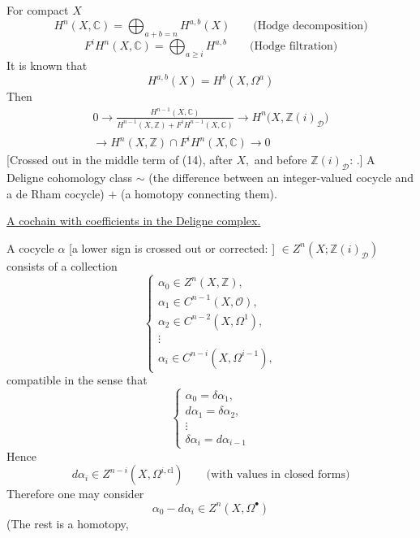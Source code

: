 For compact $X$
\begin{equation*}
H^n(X,\mathbb{C})=\bigoplus_{a+b=n}H^{a,b}(X)
\qquad\text{(Hodge decomposition)}\tag{11}
\end{equation*}
\begin{equation*}
F^iH^n(X,\mathbb{C})=\bigoplus_{a\ge i}H^{a,b}
\qquad\text{(Hodge filtration)}\tag{12}
\end{equation*}
It is known that
\begin{equation*}
H^{a,b}(X)=H^b(X,\Omega^a)\tag{13}
\end{equation*}
Then
\begin{equation*}
\begin{gathered}
0\longrightarrow
\frac{H^{n-1}(X,\mathbb{C})}
{H^{n-1}(X,\mathbb{Z})+F^iH^{n-1}(X,\mathbb{C})}
\longrightarrow H^n\bigl(X,\mathbb{Z}(i)_{\mathcal D}\bigr)\\
\longrightarrow H^n(X,\mathbb{Z})\cap F^iH^n(X,\mathbb{C})\longrightarrow0
\end{gathered}\tag{14}
\end{equation*}
[Crossed out in the middle term of (14), after $X,$ and before $\mathbb Z(i)_{\mathcal D}$:
.]
A Deligne cohomology class $\sim$ (the difference between an integer-valued cocycle and a de Rham cocycle) $+$ (a homotopy connecting them).

\underline{A cochain with coefficients in the Deligne complex.}

A cocycle $\alpha$ [a lower sign is crossed out or corrected:
]
$\in Z^n(X;\mathbb{Z}(i)_{\mathcal D})$ consists of a collection
\begin{equation*}
\begin{cases}
\alpha_0\in Z^n(X,\mathbb{Z}),\\
\alpha_1\in C^{n-1}(X,\mathcal O),\\
\alpha_2\in C^{n-2}(X,\Omega^1),\\
\vdots\\
\alpha_i\in C^{n-i}(X,\Omega^{i-1}),
\end{cases}\tag{15}
\end{equation*}
compatible in the sense that
\begin{equation*}
\begin{cases}
\alpha_0=\delta\alpha_1,\\
d\alpha_1=\delta\alpha_2,\\
\vdots\\
\delta\alpha_i=d\alpha_{i-1}
\end{cases}\tag{16}
\end{equation*}
Hence
\begin{equation*}
d\alpha_i\in Z^{n-i}(X,\Omega^{i,\mathrm{cl}})
\qquad\text{(with values in closed forms)}\tag{17}
\end{equation*}
Therefore one may consider
\begin{equation*}
\alpha_0-d\alpha_i\in Z^n(X,\Omega^\bullet)\tag{18}
\end{equation*}
(The rest is a homotopy, 


